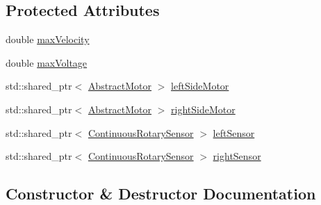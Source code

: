 \subsection*{Protected Attributes}
\begin{DoxyCompactItemize}
\item 
double \mbox{\hyperlink{classokapi_1_1SkidSteerModel_a7328ea414229603ad144297832aba668}{max\+Velocity}}
\item 
double \mbox{\hyperlink{classokapi_1_1SkidSteerModel_a5a8c43598d98dad4d2c76d5c5c9b34ad}{max\+Voltage}}
\item 
std\+::shared\+\_\+ptr$<$ \mbox{\hyperlink{classokapi_1_1AbstractMotor}{Abstract\+Motor}} $>$ \mbox{\hyperlink{classokapi_1_1SkidSteerModel_a086c099795122b42cf66c67a334a6c30}{left\+Side\+Motor}}
\item 
std\+::shared\+\_\+ptr$<$ \mbox{\hyperlink{classokapi_1_1AbstractMotor}{Abstract\+Motor}} $>$ \mbox{\hyperlink{classokapi_1_1SkidSteerModel_a858a234f53f66803c7a498e69c86032b}{right\+Side\+Motor}}
\item 
std\+::shared\+\_\+ptr$<$ \mbox{\hyperlink{classokapi_1_1ContinuousRotarySensor}{Continuous\+Rotary\+Sensor}} $>$ \mbox{\hyperlink{classokapi_1_1SkidSteerModel_ae286eda43ccd14ac74c06c95f05b14eb}{left\+Sensor}}
\item 
std\+::shared\+\_\+ptr$<$ \mbox{\hyperlink{classokapi_1_1ContinuousRotarySensor}{Continuous\+Rotary\+Sensor}} $>$ \mbox{\hyperlink{classokapi_1_1SkidSteerModel_a35b26b12648944bb561e7978468fd679}{right\+Sensor}}
\end{DoxyCompactItemize}


\subsection{Constructor \& Destructor Documentation}
\mbox{\label{classokapi_1_1SkidSteerModel_ac79ebd9b643ea68da98576ec355e94a5}} 
